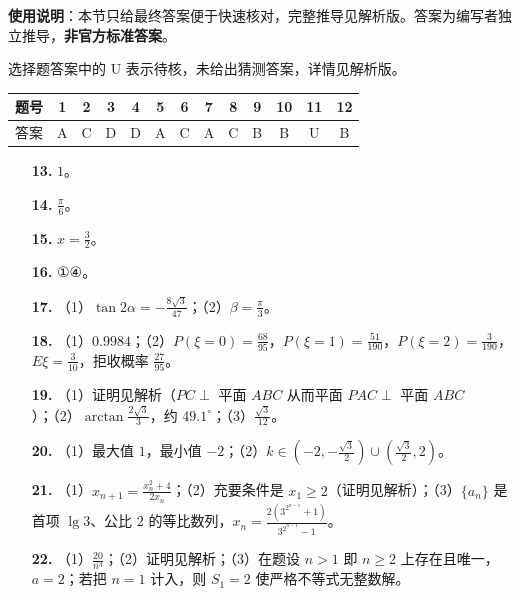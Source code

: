 
\begin{gknotice}
\textbf{使用说明}：本节只给最终答案便于快速核对，完整推导见解析版。答案为编写者独立推导，\textbf{非官方标准答案}。
\end{gknotice}

\begin{gknotice}
选择题答案中的 U 表示待核，未给出猜测答案，详情见解析版。
\end{gknotice}

\begin{center}\begin{tabular}{ccccccccccccc}
\toprule
题号 & 1 & 2 & 3 & 4 & 5 & 6 & 7 & 8 & 9 & 10 & 11 & 12 \\
\midrule
答案 & A & C & D & D & A & C & A & C & B & B & U & B \\
\bottomrule
\end{tabular}\end{center}

\begin{itemize}[leftmargin=2.6em]
  \item[\textbf{13.}] $1$。
  \item[\textbf{14.}] $\frac{\pi}{6}$。
  \item[\textbf{15.}] $x=\frac32$。
  \item[\textbf{16.}] ①④。
\end{itemize}

\begin{itemize}[leftmargin=2.6em]
  \item[\textbf{17.}] （1）$\tan2\alpha=-\frac{8\sqrt3}{47}$；（2）$\beta=\frac{\pi}{3}$。
  \item[\textbf{18.}] （1）$0.9984$；（2）$P(\xi=0)=\frac{68}{95}$，$P(\xi=1)=\frac{51}{190}$，$P(\xi=2)=\frac{3}{190}$，$E\xi=\frac{3}{10}$，拒收概率 $\frac{27}{95}$。
  \item[\textbf{19.}] （1）证明见解析（$PC\perp$ 平面 $ABC$ 从而平面 $PAC\perp$ 平面 $ABC$）；（2）$\arctan\frac{2\sqrt3}{3}$，约 $49.1^\circ$；（3）$\frac{\sqrt3}{12}$。
  \item[\textbf{20.}] （1）最大值 $1$，最小值 $-2$；（2）$k\in\left(-2,-\frac{\sqrt3}{2}\right)\cup\left(\frac{\sqrt3}{2},2\right)$。
  \item[\textbf{21.}] （1）$x_{n+1}=\frac{x_n^2+4}{2x_n}$；（2）充要条件是 $x_1\geqslant2$（证明见解析）；（3）$\{a_n\}$ 是首项 $\lg3$、公比 $2$ 的等比数列，$x_n=\frac{2\left(3^{2^{n-1}}+1\right)}{3^{2^{n-1}}-1}$。
  \item[\textbf{22.}] （1）$\frac{20}{n^3}$；（2）证明见解析；（3）在题设 $n>1$ 即 $n\geqslant2$ 上存在且唯一，$a=2$；若把 $n=1$ 计入，则 $S_1=2$ 使严格不等式无整数解。
\end{itemize}
